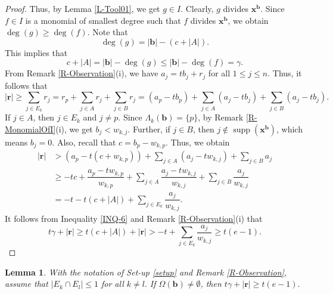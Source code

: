 \documentclass[12pt,reqno]{amsart}
\newtheorem{lemma}[thm]{Lemma}
\theoremstyle{definition}
\newcommand{\x}{\mathbf{x}}
\newcommand{\bb}{\mathbf{b}}
\newcommand{\br}{\mathbf{r}}
\newcommand{\Om}{\Omega}
\newcommand{\Lm}{\Lambda}
\newcommand{\supp}[1]{\operatorname{supp}\left(#1\right)}
\numberwithin{equation}{section}
\begin{document}
\begin{proof}
    Thus, by Lemma \ref{L-Tool01}, we get $g \in I.$ Clearly, $g$ divides $\x^{\bb}.$ Since $f \in I$ is a monomial of smallest degree such that $f$ divides $\x^{\bb}$, we obtain $\deg(g) \ge \deg(f).$ Note that 
    \[\deg(g) = |\bb| - (c + |A|).\] 
    This implies that 
    \begin{equation}\label{INQ-6}
        c + |A| = |\bb| - \deg(g) \le |\bb| - \deg(f) = \gamma.
    \end{equation}
    From Remark \ref{R-Observation}(i), we have $a_j = tb_j + r_j$ for all $1 \le j \le n.$ Thus, it follows that 
    \[|\br| \ge \sum_{j \in E_k} r_j = r_p + \sum_{j \in A} r_j + \sum_{j \in B} r_j = (a_p - tb_p) + \sum_{j \in A} (a_j - tb_j) + \sum_{j \in B} (a_j - tb_j).\]
    If $j \in A$, then $j \in E_k$ and $j \ne p.$ Since $\Lm_k(\bb) = \{p\}$, by Remark \ref{R-MonomialOfI}(i), we get $b_j < w_{k, j}.$ Further, if $j \in B$, then $j \notin \supp{\x^{\bb}}$, which means $b_j = 0.$ Also, recall that $c = b_p - w_{k, p}.$ Thus, we obtain
    \begin{align*}
        |\br| & > (a_p - t(c + w_{k, p})) + \sum_{j \in A} (a_j - t w_{k, j}) + \sum_{j \in B} a_j \\
        & \ge - tc + \dfrac{a_p - tw_{k, p}}{w_{k, p}} + \sum_{j \in A} \dfrac{a_j - t w_{k, j}}{w_{k, j}} + \sum_{j \in B} \dfrac{a_j}{w_{k, j}} \\
        & = - t - t(c + |A|) + \sum_{j \in E_k} \dfrac{a_j}{w_{k, j}}.
    \end{align*}
    It follows from Inequality \ref{INQ-6} and Remark \ref{R-Observation}(i) that 
    \[t \gamma + |\br| \ge t(c + |A|) + |\br| > - t + \sum_{j \in E_k} \dfrac{a_j}{w_{k, j}} \ge t(e - 1).\]
\end{proof}

\begin{lemma}\label{L-Tool04}
   With the notation of Set-up \ref{setup} and Remark \ref{R-Observation}, assume that $|E_k \cap E_l| \le 1$ for all $k \ne l.$ If $\Om(\bb) \ne \emptyset$, then $t\gamma + |\br| \ge t(e - 1).$
\end{lemma}
\end{document}
